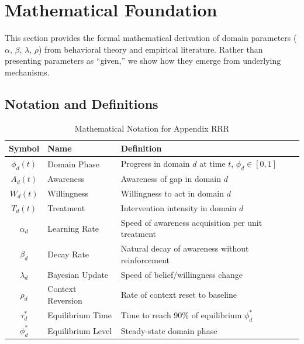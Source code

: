 \section{Mathematical Foundation}
\label{rrr:mathfoundation}

\begin{tcolorbox}[colback=blue!5!white, colframe=blue!75!black, title=Purpose]
This section provides the formal mathematical derivation of domain parameters
($\alpha$, $\beta$, $\lambda$, $\rho$) from behavioral theory and empirical literature.
Rather than presenting parameters as ``given,'' we show how they emerge from
underlying mechanisms.
\end{tcolorbox}

\subsection{Notation and Definitions}

\begin{table}[htbp]
\centering
\caption{Mathematical Notation for Appendix RRR}
\label{tab:rrr-notation}
\renewcommand{\arraystretch}{1.3}
\small
\begin{tabular}{@{}clp{6cm}@{}}
\toprule
\textbf{Symbol} & \textbf{Name} & \textbf{Definition} \\
\midrule
$\phi_d(t)$ & Domain Phase & Progress in domain $d$ at time $t$, $\phi_d \in [0,1]$ \\
$A_d(t)$ & Awareness & Awareness of gap in domain $d$ \\
$W_d(t)$ & Willingness & Willingness to act in domain $d$ \\
$T_d(t)$ & Treatment & Intervention intensity in domain $d$ \\
$\alpha_d$ & Learning Rate & Speed of awareness acquisition per unit treatment \\
$\beta_d$ & Decay Rate & Natural decay of awareness without reinforcement \\
$\lambda_d$ & Bayesian Update & Speed of belief/willingness change \\
$\rho_d$ & Context Reversion & Rate of context reset to baseline \\
$\tau_d^*$ & Equilibrium Time & Time to reach 90\% of equilibrium $\phi_d^*$ \\
$\phi_d^*$ & Equilibrium Level & Steady-state domain phase \\
\bottomrule
\end{tabular}
\end{table}

